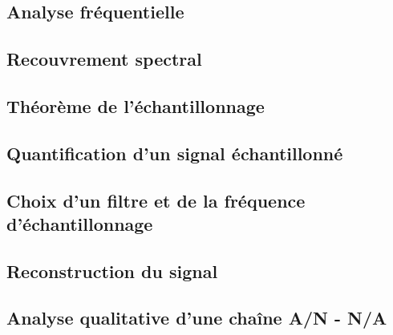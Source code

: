 \documentclass[10pt, twocolumn]{article}
\begin{document}
		\subsection*{Analyse fréquentielle}
		\subsection*{Recouvrement spectral}
		\subsection*{Théorème de l'échantillonnage}
		\subsection*{Quantification d'un signal échantillonné}
		\subsection*{Choix d'un filtre et de la fréquence d'échantillonnage}
		\subsection*{Reconstruction du signal}
		\subsection*{Analyse qualitative d'une chaîne A/N - N/A}
		
\end{document}
